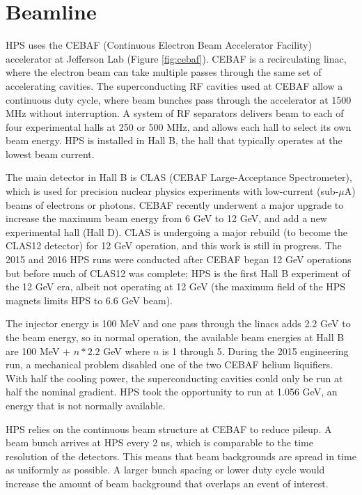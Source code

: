 \section{Beamline}
\label{sec:beamline}

HPS uses the CEBAF (Continuous Electron Beam Accelerator Facility) accelerator at Jefferson Lab (Figure \ref{fig:cebaf}).
CEBAF is a recirculating linac, where the electron beam can take multiple passes through the same set of accelerating cavities.
The superconducting RF cavities used at CEBAF allow a continuous duty cycle, where beam bunches pass through the accelerator at 1500 MHz without interruption.
A system of RF separators delivers beam to each of four experimental halls at 250 or 500 MHz, and allows each hall to select its own beam energy.
HPS is installed in Hall B, the hall that typically operates at the lowest beam current.

The main detector in Hall B is CLAS (CEBAF Large-Acceptance Spectrometer), which is used for precision nuclear physics experiments with low-current (sub-$\mu$A) beams of electrons or photons. CEBAF recently underwent a major upgrade to increase the maximum beam energy from 6 GeV to 12 GeV, and add a new experimental hall (Hall D).
CLAS is undergoing a major rebuild (to become the CLAS12 detector) for 12 GeV operation, and this work is still in progress.
The 2015 and 2016 HPS runs were conducted after CEBAF began 12 GeV operations but before much of CLAS12 was complete; HPS is the first Hall B experiment of the 12 GeV era, albeit not operating at 12 GeV (the maximum field of the HPS magnets limits HPS to 6.6 GeV beam).

The injector energy is 100 MeV and one pass through the linacs adds 2.2 GeV to the beam energy, so in normal operation, the available beam energies at Hall B are 100 MeV + $n*2.2$ GeV where $n$ is 1 through 5.
During the 2015 engineering run, a mechanical problem disabled one of the two CEBAF helium liquifiers.
With half the cooling power, the superconducting cavities could only be run at half the nominal gradient.
HPS took the opportunity to run at 1.056 GeV, an energy that is not normally available.

HPS relies on the continuous beam structure at CEBAF to reduce pileup.
A beam bunch arrives at HPS every 2 ns, which is comparable to the time resolution of the detectors.
This means that beam backgrounds are spread in time as uniformly as possible.
A larger bunch spacing or lower duty cycle would increase the amount of beam background that overlaps an event of interest.

